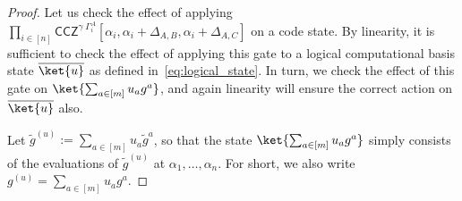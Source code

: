 \documentclass[11pt]{article}
\theoremstyle{definition}
\newcommand{\CCZ}{\mathsf{CCZ}}
\newcommand*{\ol}{\overline}
\begin{document}
\begin{proof}
    Let us check the effect of applying $\prod_{i \in [n]} \CCZ^{\gamma\;\Gamma^A_i}[\alpha_i, \alpha_i + \Delta_{A,B}, \alpha_i + \Delta_{A,C}]$ on a code state. By linearity, it is sufficient to check the effect of applying this gate to a logical computational basis state $\ol{\ket{u}}$ as defined in~\eqref{eq:logical_state}. In turn, we check the effect of this gate on $\ket{\sum_{a \in [m]} u_a g^a}$, and again linearity will ensure the correct action on $\overline{\ket{u}}$ also.

    Let $\tilde{g}^{(u)} := \sum_{a \in [m]} u_a \tilde{g}^a$, so that the state $\ket{\sum_{a \in [m]} u_a g^a}$ simply consists of the evaluations of $\tilde{g}^{(u)}$ at $\alpha_1, \dots, \alpha_n$. For short, we also write $g^{(u)} = \sum_{a \in [m]} u_a g^a$.
    

\end{proof}
\end{document}
